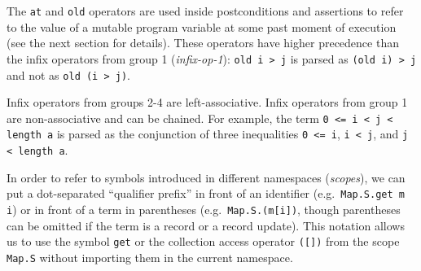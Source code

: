 The \texttt{at} and \texttt{old} operators are used inside
postconditions and assertions to refer to the value of
a mutable program variable at some past moment of execution
(see the next section for details).
These operators have higher precedence than the infix
operators from group 1 (\textsl{infix-op-1}): \texttt{old i > j}
is parsed as \texttt{(old i) > j} and not as \texttt{old (i > j)}.

Infix operators from groups 2-4 are left-associative.
Infix operators from group 1 are non-associative and
can be chained. For example, the term \texttt{0 <= i < j < length a}
is parsed as the conjunction of three inequalities \texttt{0 <= i},
\texttt{i < j}, and \texttt{j < length a}.

In order to refer to symbols introduced in different namespaces
(\textit{scopes}), we can put a dot-separated
``qualifier prefix'' in front of an identifier
(e.g.~\texttt{Map.S.get m i}) or in front of a term in parentheses
(e.g.~\texttt{Map.S.(m[i])}, though parentheses can be omitted
if the term is a record or a record update). This notation allows
us to use the symbol \texttt{get} or the collection access operator
\texttt{([])} from the scope \texttt{Map.S} without importing
them in the current namespace.

